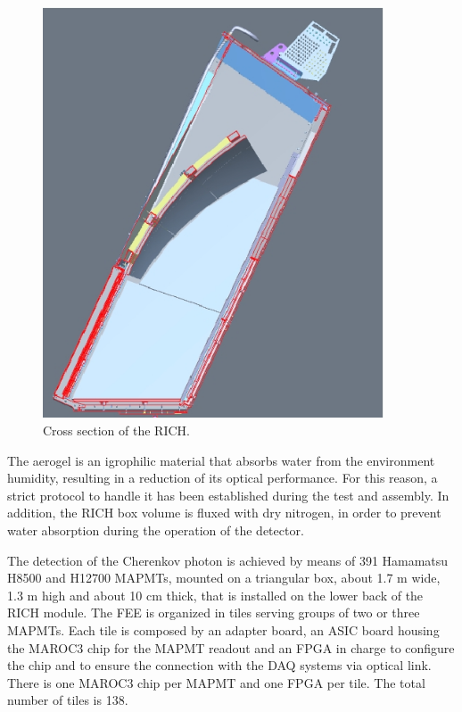 \documentclass[12pt]{article}
\begin{document}
\begin{figure}[h!]
\center
\includegraphics[width=0.9\textwidth]{Rich_lateral.jpg}
\caption{ \label{fig:RICH_inner} Cross section of the RICH.}
\end{figure}

The aerogel is an igrophilic material that absorbs water from the environment humidity, resulting in a reduction of its optical performance.
For this reason, a strict protocol to handle it has been established during the test and assembly.
In addition, the RICH box volume is fluxed with dry nitrogen, in order to prevent water absorption during the operation of the detector.

The detection of the Cherenkov photon is achieved by means of 391 Hamamatsu H8500 and H12700 MAPMTs, mounted on a triangular box, about 1.7 m wide, 1.3 m high and about 10 cm thick, that is installed on the lower back of the RICH module.
The FEE is organized in tiles serving groups of two or three MAPMTs.
Each tile is composed by an adapter board, an ASIC board housing the MAROC3 chip for the MAPMT readout and an FPGA in charge to configure the chip and to ensure the connection with the DAQ systems via optical link.
There is one MAROC3 chip per MAPMT and one FPGA per tile.
The total number of tiles is 138.
\end{document}
